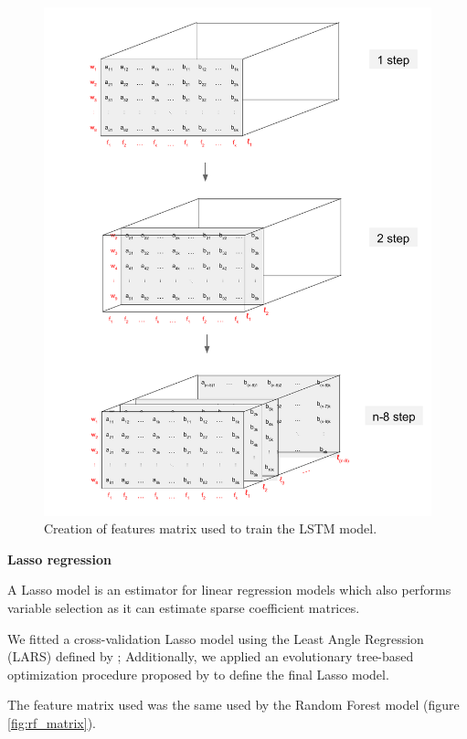 \documentclass[12pt]{report}
\begin{document}
\begin{description}
\begin{figure}
\centering
\includegraphics[width = \textwidth]{lstm_matrix.pdf}
\caption{Creation of features matrix used to train the LSTM model.}
\label{fig:lstm_matrix}
\end{figure}

 \item \textbf{Lasso regression}
 
  A Lasso model is an estimator for linear regression models which also performs variable selection as it can estimate sparse coefficient matrices. 
  
  We fitted a cross-validation Lasso model using the Least Angle Regression (LARS) defined by \citet{efron2004least}; Additionally, we applied an evolutionary tree-based optimization procedure proposed by \citet{olson2016evaluation} to define the final Lasso model.
  
    The feature matrix used was the same used by the Random Forest model (figure \ref{fig:rf_matrix}).
  
\end{description}
\end{document}
